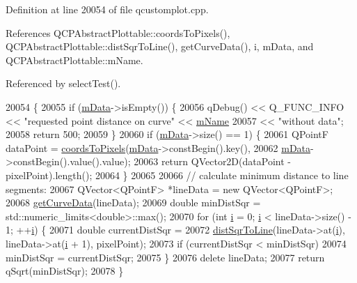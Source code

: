 Definition at line 20054 of file qcustomplot.\+cpp.



References Q\+C\+P\+Abstract\+Plottable\+::coords\+To\+Pixels(), Q\+C\+P\+Abstract\+Plottable\+::dist\+Sqr\+To\+Line(), get\+Curve\+Data(), i, m\+Data, and Q\+C\+P\+Abstract\+Plottable\+::m\+Name.



Referenced by select\+Test().


\begin{DoxyCode}
20054                                                               \{
20055   \textcolor{keywordflow}{if} (\hyperlink{class_q_c_p_curve_a88d533e455bca96004b049e99168731b}{mData}->isEmpty()) \{
20056     qDebug() << Q\_FUNC\_INFO << \textcolor{stringliteral}{"requested point distance on curve"} << \hyperlink{class_q_c_p_abstract_plottable_ac29ffef424e2488675930de18cde612a}{mName}
20057              << \textcolor{stringliteral}{"without data"};
20058     \textcolor{keywordflow}{return} 500;
20059   \}
20060   \textcolor{keywordflow}{if} (\hyperlink{class_q_c_p_curve_a88d533e455bca96004b049e99168731b}{mData}->size() == 1) \{
20061     QPointF dataPoint = \hyperlink{class_q_c_p_abstract_plottable_ade710a776104b14c1c835168ce1bfc5c}{coordsToPixels}(\hyperlink{class_q_c_p_curve_a88d533e455bca96004b049e99168731b}{mData}->constBegin().key(),
20062                                        \hyperlink{class_q_c_p_curve_a88d533e455bca96004b049e99168731b}{mData}->constBegin().value().value);
20063     \textcolor{keywordflow}{return} QVector2D(dataPoint - pixelPoint).length();
20064   \}
20065 
20066   \textcolor{comment}{// calculate minimum distance to line segments:}
20067   QVector<QPointF> *lineData = \textcolor{keyword}{new} QVector<QPointF>;
20068   \hyperlink{class_q_c_p_curve_afa895f8ba9ae34fea6ecea295fd7b1e5}{getCurveData}(lineData);
20069   \textcolor{keywordtype}{double} minDistSqr = std::numeric\_limits<double>::max();
20070   \textcolor{keywordflow}{for} (\textcolor{keywordtype}{int} \hyperlink{_comparision_pictures_2_createtest_image_8m_a6f6ccfcf58b31cb6412107d9d5281426}{i} = 0; \hyperlink{_comparision_pictures_2_createtest_image_8m_a6f6ccfcf58b31cb6412107d9d5281426}{i} < lineData->size() - 1; ++\hyperlink{_comparision_pictures_2_createtest_image_8m_a6f6ccfcf58b31cb6412107d9d5281426}{i}) \{
20071     \textcolor{keywordtype}{double} currentDistSqr =
20072         \hyperlink{class_q_c_p_abstract_plottable_a5ea1cab44ca912dcdc96ed81ec5bed5d}{distSqrToLine}(lineData->at(\hyperlink{_comparision_pictures_2_createtest_image_8m_a6f6ccfcf58b31cb6412107d9d5281426}{i}), lineData->at(\hyperlink{_comparision_pictures_2_createtest_image_8m_a6f6ccfcf58b31cb6412107d9d5281426}{i} + 1), pixelPoint);
20073     \textcolor{keywordflow}{if} (currentDistSqr < minDistSqr)
20074       minDistSqr = currentDistSqr;
20075   \}
20076   \textcolor{keyword}{delete} lineData;
20077   \textcolor{keywordflow}{return} qSqrt(minDistSqr);
20078 \}
\end{DoxyCode}


